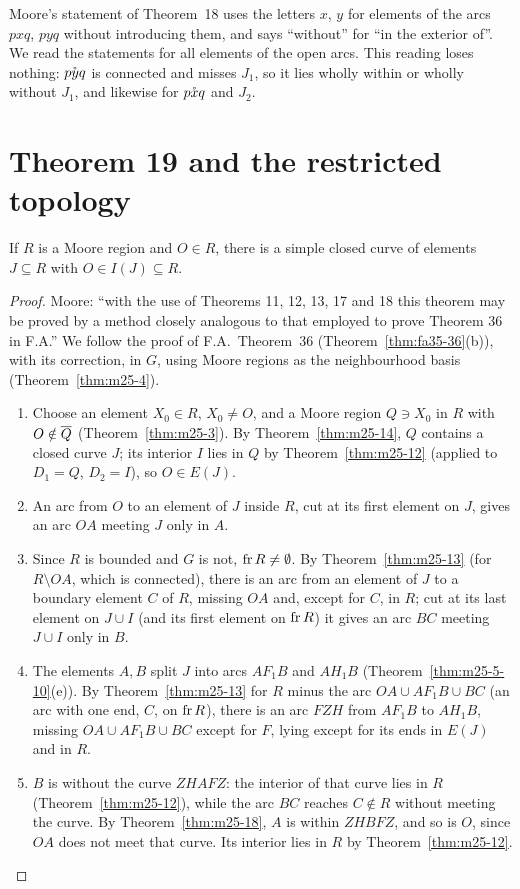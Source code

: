 
Moore's statement of Theorem~18 uses the letters $x$, $y$ for elements of the arcs $pxq$, $pyq$ without
introducing them, and says ``without'' for ``in the exterior of''. We read the statements for all elements of the
open arcs. This reading loses nothing: $\mathring{pyq}$ is connected and misses $J_1$, so it lies wholly within or wholly
without $J_1$, and likewise for $\mathring{pxq}$ and $J_2$.

\section{Theorem 19 and the restricted topology}

\begin{theorem}\label{thm:m25-19}
If $R$ is a Moore region and $O\in R$, there is a simple closed curve of elements $J\subseteq R$ with
$O\in I(J)\subseteq R$.
\end{theorem}

\begin{proof}
Moore: ``with the use of Theorems 11, 12, 13, 17 and 18 this theorem may be proved by a method closely analogous to
that employed to prove Theorem 36 in F.A.'' We follow the proof of F.A.\ Theorem~36
(Theorem~\ref{thm:fa35-36}(b)), with its correction, in $G$, using Moore regions as the neighbourhood basis
(Theorem~\ref{thm:m25-4}).
\begin{enumerate}[label=(\arabic*)]
\item Choose an element $X_0\in R$, $X_0\ne O$, and a Moore region $Q\ni X_0$ in $R$ with $O\notin\overline{Q}$
(Theorem~\ref{thm:m25-3}). By Theorem~\ref{thm:m25-14}, $Q$ contains a closed curve $J$; its interior $I$
lies in $Q$ by Theorem~\ref{thm:m25-12} (applied to $D_1=Q$, $D_2=I$), so $O\in E(J)$.
\item An arc from $O$ to an element of $J$ inside $R$, cut at its first element on $J$, gives an arc $OA$
meeting $J$ only in $A$.
\item Since $R$ is bounded and $G$ is not, $\operatorname{fr} R\ne\emptyset$. By Theorem~\ref{thm:m25-13} (for $R\setminus OA$,
which is connected), there is an arc from an element of $J$ to a boundary element $C$ of $R$, missing $OA$ and,
except for $C$, in $R$; cut at its last element on $J\cup I$ (and its first element on $\operatorname{fr} R$) it gives an arc
$BC$ meeting $J\cup I$ only in $B$.
\item The elements $A,B$ split $J$ into arcs $AF_1B$ and $AH_1B$ (Theorem~\ref{thm:m25-5-10}(e)). By
Theorem~\ref{thm:m25-13} for $R$ minus the arc $OA\cup AF_1B\cup BC$ (an arc with one end, $C$, on $\operatorname{fr} R$),
there is an arc $FZH$ from $AF_1B$ to $AH_1B$, missing $OA\cup AF_1B\cup BC$ except for $F$, lying except for its ends in
$E(J)$ and in $R$.
\item $B$ is without the curve $ZHAFZ$: the interior of that curve lies in $R$ (Theorem~\ref{thm:m25-12}), while the arc
$BC$ reaches $C\notin R$ without meeting the curve. By Theorem~\ref{thm:m25-18}, $A$ is within $ZHBFZ$, and so is $O$,
since $OA$ does not meet that curve. Its interior lies in $R$ by Theorem~\ref{thm:m25-12}.
\end{enumerate}
\end{proof}

